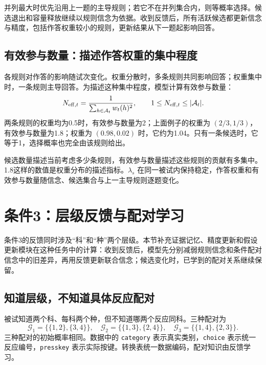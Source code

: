 \documentclass[12pt]{article}
\begin{document}
并列最大时优先沿用上一题的主导规则；若它不在并列集合内，则等概率选择。候选退出和容量释放继续以规则信念为依据。收到反馈后，所有活跃候选都更新信念与精度，包括作答权重较小的规则，更新结果从下一题起影响回答。

\subsection{有效参与数量：描述作答权重的集中程度}

各规则对作答的影响随试次变化。权重分散时，多条规则共同影响回答；权重集中时，一条规则主导回答。为描述这种集中程度，模型计算有效参与数量：
\begin{equation}
N_{{\rm eff},t}=\frac{1}{\sum_{h\in \mathcal A_t}w_t(h)^2},
\qquad 1\leq N_{{\rm eff},t}\leq|\mathcal A_t|.
\label{eq:effective-participation}
\end{equation}
两条规则的权重均为0.5时，有效参与数量为2；上面例子的权重为 $(2/3,1/3)$，有效参与数量为1.8；权重为 $(0.98,0.02)$ 时，它约为1.04。只有一条候选时，它等于1，选择概率也完全由该规则给出。

候选数量描述当前考虑多少条规则，有效参与数量描述这些规则的贡献有多集中。1.8这样的数值是权重分布的描述指标。$\lambda_s$ 在同一被试内保持稳定，作答权重和有效参与数量随信念、候选集合与上一主导规则逐题变化。

\section{条件3：层级反馈与配对学习}
\label{sec:pairing}

条件3的反馈同时涉及“科”和“种”两个层级。本节补充证据记忆、精度更新和假设更新模块在这种任务中的计算：收到反馈后，模型先分别减弱规则信念和条件配对信念中的旧差异，再用反馈更新联合信念；候选变化时，已学到的配对关系继续保留。

\subsection{知道层级，不知道具体反应配对}

被试知道两个科、每科两个种，但不知道哪两个反应同科。三种配对为
\begin{equation}
\mathcal G_1=\{\{1,2\},\{3,4\}\},\quad
\mathcal G_2=\{\{1,3\},\{2,4\}\},\quad
\mathcal G_3=\{\{1,4\},\{2,3\}\}.
\end{equation}
三种配对的初始概率相同。数据中的 \texttt{category} 表示真实类别，\texttt{choice} 表示统一反应编号，\texttt{presskey} 表示实际按键。转换表统一数据编码，配对知识由反馈学习。
\end{document}
